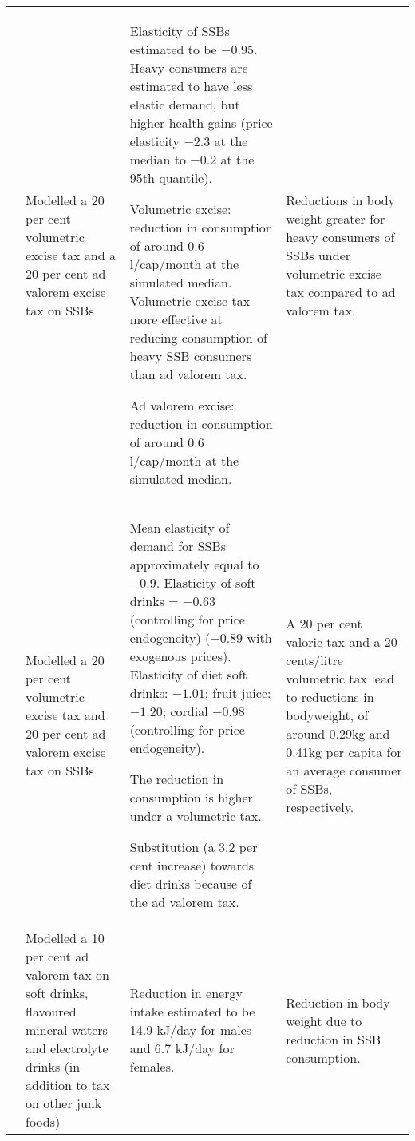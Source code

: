 \begin{longtable}{Xp{4.3cm}p{10.1cm}p{6.2cm}}
\textcite{Etile2015DoHighConsumers}  & Modelled a 20 per cent volumetric excise tax and a 20 per cent ad valorem excise tax on SSBs & Elasticity of SSBs estimated to be \(-0.95\). Heavy consumers are estimated to have less elastic demand, but higher health gains (price elasticity $-$2.3 at the median to $-$0.2 at the 95th quantile).

Volumetric excise: reduction in consumption of around 0.6 l/cap/month at the simulated median. Volumetric excise tax more effective at reducing consumption of heavy SSB consumers than ad valorem tax.

Ad valorem excise: reduction in consumption of around 0.6 l/cap/month at the simulated median. & Reductions in body weight greater for heavy consumers of SSBs under volumetric excise tax compared to ad valorem tax. \\
\textcite{Sharma2014effectstaxingsugarsweetened} & Modelled a 20 per cent volumetric excise tax and 20 per cent ad valorem excise tax on SSBs & Mean elasticity of demand for SSBs approximately equal to \(-0.9\). Elasticity of soft drinks = \(-0.63\) (controlling for price endogeneity) (\(-0.89\) with exogenous prices). Elasticity of diet soft drinks: \(-1.01\); fruit juice: \(-1.20\); cordial \(-0.98\) (controlling for price endogeneity).

The reduction in consumption is higher under a volumetric tax.

Substitution (a 3.2 per cent increase) towards diet drinks because of the ad valorem tax. & A 20 per cent valoric tax and a 20 cents/litre volumetric tax lead to reductions in bodyweight, of around 0.29kg and 0.41kg per capita for an average consumer of SSBs, respectively. \\
\textcite{Sacks2011Statesshouldstand} & Modelled a 10 per cent ad valorem tax on soft drinks, flavoured mineral waters and electrolyte drinks (in addition to tax on other junk foods) & Reduction in energy intake estimated to be 14.9 kJ/day for males and 6.7 kJ/day for females. & Reduction in body weight due to reduction in SSB consumption. \\

\end{longtable}